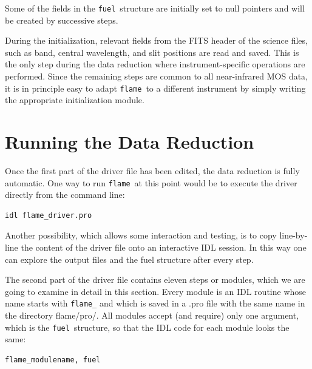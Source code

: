\documentclass[a4paper, notitlepage]{article}
\newcommand{\flame}{\texttt{flame}}
\newcommand{\fuel}{\texttt{fuel}}
\begin{document}
Some of the fields in the \fuel\ structure are initially set to null pointers and will be created by successive steps.

During the initialization, relevant fields from the FITS header of the science files, such as band, central wavelength, and slit positions are read and saved. This is the only step during the data reduction where instrument-specific operations are performed. Since the remaining steps are common to all near-infrared MOS data, it is in principle easy to adapt \flame\ to a different instrument by simply writing the appropriate initialization module.








\section{Running the Data Reduction}
\label{sec:data_reduction}

Once the first part of the driver file has been edited, the data reduction is fully automatic. One way to run \flame\ at this point would be to execute the driver directly from the command line:
\begin{lstlisting}
idl flame_driver.pro
\end{lstlisting}
Another possibility, which allows some interaction and testing, is to copy line-by-line the content of the driver file onto an interactive IDL session. In this way one can explore the output files and the fuel structure after every step.

The second part of the driver file contains eleven steps or modules, which we are going to examine in detail in this section. Every module is an IDL routine whose name starts with \texttt{flame\_} and which is saved in a .pro file with the same name in the directory flame/pro/. All modules accept (and require) only one argument, which is the \fuel\ structure, so that the IDL code for each module looks the same:
\begin{lstlisting}
flame_modulename, fuel
\end{lstlisting}
\end{document}
